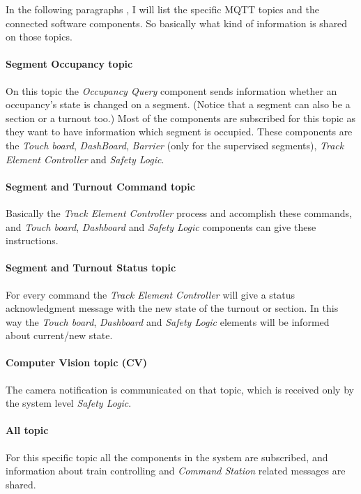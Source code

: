 In the following paragraphs , I will list the specific MQTT topics and the connected software components. So basically what kind of information is shared on those topics.

\paragraph{Segment Occupancy topic}
On this topic the \textit{Occupancy Query} component sends information whether an occupancy's state is changed on a segment. (Notice that a segment can also be a section or a turnout too.) Most of the components are subscribed for this topic as they want to have information which segment is occupied. These components are the \textit{Touch board}, \textit{DashBoard}, \textit{Barrier} (only for the supervised segments), \textit{Track Element Controller} and \textit{Safety Logic}.

\paragraph{Segment and Turnout Command topic}\label{par:MQTTTopicCommand}
Basically the \textit{Track Element Controller} process and accomplish these commands, and \textit{Touch board}, \textit{Dashboard} and \textit{Safety Logic} components can give these instructions.

\paragraph{Segment and Turnout Status topic}\label{par:MQTTTopicStatus}
For every command the \textit{Track Element Controller} will give a status acknowledgment message with the new state of the turnout or section. In this way the \textit{Touch board}, \textit{Dashboard} and \textit{Safety Logic} elements will be informed about current/new state.

\paragraph{Computer Vision topic (CV)}
The camera notification is communicated on that topic, which is received only by the system level \textit{Safety Logic}.

\paragraph{All topic}
For this specific topic all the components in the system are subscribed, and information about train controlling and \textit{Command Station} related messages are shared.

